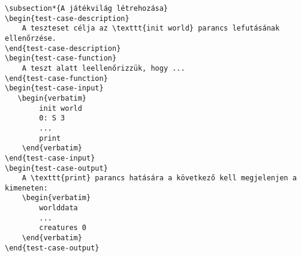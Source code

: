 \documentclass[]{article}
\begin{document}
\begin{lstlisting}
\subsection*{A játékvilág létrehozása}
\begin{test-case-description}
    A teszteset célja az \texttt{init world} parancs lefutásának ellenőrzése.
\end{test-case-description}
\begin{test-case-function}
    A teszt alatt leellenőrizzük, hogy ...
\end{test-case-function}
\begin{test-case-input}
   \begin{verbatim}
        init world
        0: S 3
        ...
        print
    \end{verbatim}
\end{test-case-input}
\begin{test-case-output}
    A \texttt{print} parancs hatására a következő kell megjelenjen a kimeneten:
    \begin{verbatim}
        worlddata
        ...
        creatures 0
    \end{verbatim}
\end{test-case-output}
\end{lstlisting}
\end{document}
